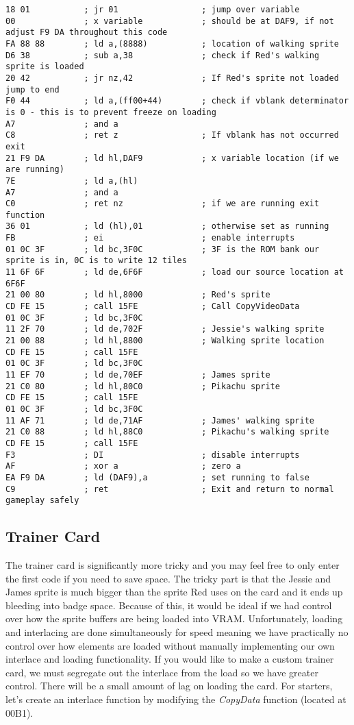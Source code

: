 \documentclass[../main.tex]{subfiles}
\begin{document}
    \begin{verbatim}
18 01           ; jr 01                 ; jump over variable
00              ; x variable            ; should be at DAF9, if not adjust F9 DA throughout this code
FA 88 88        ; ld a,(8888)           ; location of walking sprite
D6 38           ; sub a,38              ; check if Red's walking sprite is loaded
20 42           ; jr nz,42              ; If Red's sprite not loaded jump to end
F0 44           ; ld a,(ff00+44)        ; check if vblank determinator is 0 - this is to prevent freeze on loading
A7              ; and a
C8              ; ret z                 ; If vblank has not occurred exit
21 F9 DA        ; ld hl,DAF9            ; x variable location (if we are running)
7E              ; ld a,(hl)
A7              ; and a
C0              ; ret nz                ; if we are running exit function
36 01           ; ld (hl),01            ; otherwise set as running
FB              ; ei                    ; enable interrupts
01 0C 3F        ; ld bc,3F0C            ; 3F is the ROM bank our sprite is in, 0C is to write 12 tiles
11 6F 6F        ; ld de,6F6F            ; load our source location at 6F6F
21 00 80        ; ld hl,8000            ; Red's sprite
CD FE 15        ; call 15FE             ; Call CopyVideoData
01 0C 3F        ; ld bc,3F0C
11 2F 70        ; ld de,702F            ; Jessie's walking sprite
21 00 88        ; ld hl,8800            ; Walking sprite location
CD FE 15        ; call 15FE
01 0C 3F        ; ld bc,3F0C
11 EF 70        ; ld de,70EF            ; James sprite
21 C0 80        ; ld hl,80C0            ; Pikachu sprite
CD FE 15        ; call 15FE
01 0C 3F        ; ld bc,3F0C
11 AF 71        ; ld de,71AF            ; James' walking sprite
21 C0 88        ; ld hl,88C0            ; Pikachu's walking sprite
CD FE 15        ; call 15FE
F3              ; DI                    ; disable interrupts
AF              ; xor a                 ; zero a
EA F9 DA        ; ld (DAF9),a           ; set running to false
C9              ; ret                   ; Exit and return to normal gameplay safely
    \end{verbatim}

    \subsection{Trainer Card}
    The trainer card is significantly more tricky and you may feel free to only enter the first code if you need to save space.  The tricky part is that the Jessie and James sprite is much bigger than the sprite Red uses on the card and it ends up bleeding into badge space.  Because of this, it would be ideal if we had control over how the sprite buffers are being loaded into VRAM.  Unfortunately, loading and interlacing are done simultaneously for speed meaning we have practically no control over how elements are loaded without manually implementing our own interlace and loading functionality.  If you would like to make a custom trainer card, we must segregate out the interlace from the load so we have greater control.  There will be a small amount of lag on loading the card.  For starters, let's create an interlace function by modifying the \textit{CopyData} function (located at 00B1).
\end{document}

